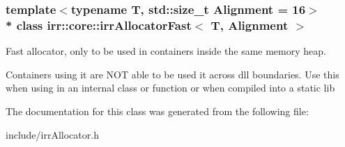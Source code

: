 \subsubsection*{template$<$typename T, std\+::size\+\_\+t Alignment = 16$>$\\*
class irr\+::core\+::irr\+Allocator\+Fast$<$ T, Alignment $>$}

Fast allocator, only to be used in containers inside the same memory heap. 

Containers using it are N\+OT able to be used it across dll boundaries. Use this when using in an internal class or function or when compiled into a static lib 

The documentation for this class was generated from the following file\+:\begin{DoxyCompactItemize}
\item 
include/irr\+Allocator.\+h\end{DoxyCompactItemize}

